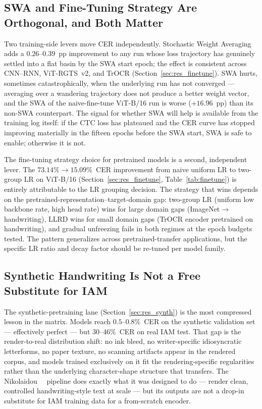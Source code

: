 \subsection{SWA and Fine-Tuning Strategy Are Orthogonal, and Both Matter}
\label{sec:disc_swa_ft}

Two training-side levers move CER independently. Stochastic Weight Averaging~\cite{izmailov2018swa} adds a $0.26$--$0.39$~pp improvement to any run whose loss trajectory has genuinely settled into a flat basin by the SWA start epoch; the effect is consistent across CNN--RNN, ViT-RGTS~v2, and TrOCR (Section~\ref{sec:res_finetune}). SWA hurts, sometimes catastrophically, when the underlying run has not converged --- averaging over a wandering trajectory does not produce a better weight vector, and the SWA of the naive-fine-tune ViT-B/16 run is worse ($+16.96$~pp) than its non-SWA counterpart. The signal for whether SWA will help is available from the training log itself: if the CTC loss has plateaued and the CER curve has stopped improving materially in the fifteen epochs before the SWA start, SWA is safe to enable; otherwise it is not.

The fine-tuning strategy choice for pretrained models is a second, independent lever. The $73.14\% \to 15.09\%$~CER improvement from naive uniform LR to two-group LR on ViT-B/16 (Section~\ref{sec:res_finetune}, Table~\ref{tab:finetune}) is entirely attributable to the LR grouping decision. The strategy that wins depends on the pretrained-representation--target-domain gap: two-group LR (uniform low backbone rate, high head rate) wins for large domain gaps (ImageNet$\to$handwriting), LLRD wins for small domain gaps (TrOCR encoder pretrained on handwriting), and gradual unfreezing fails in both regimes at the epoch budgets tested. The pattern generalizes across pretrained-transfer applications, but the specific LR ratio and decay factor should be re-tuned per model family.

\subsection{Synthetic Handwriting Is Not a Free Substitute for IAM}
\label{sec:disc_synth}

The synthetic-pretraining lane (Section~\ref{sec:res_synth}) is the most compressed lesson in the matrix. Models reach $0.5$--$0.8\%$~CER on the synthetic validation set --- effectively perfect --- but $30$--$46\%$~CER on real IAM test. That gap is the render-to-real distribution shift: no ink bleed, no writer-specific idiosyncratic letterforms, no paper texture, no scanning artifacts appear in the rendered corpus, and models trained exclusively on it fit the rendering-specific regularities rather than the underlying character-shape structure that transfers. The Nikolaidou~\etal~\cite{nikolaidou2023wordstylist} pipeline does exactly what it was designed to do --- render clean, controlled handwriting-style text at scale --- but its outputs are not a drop-in substitute for IAM training data for a from-scratch encoder.

